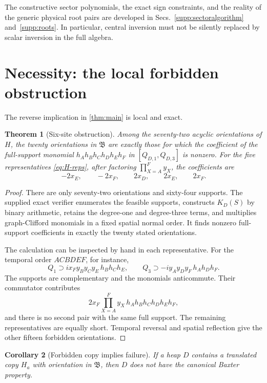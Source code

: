 \documentclass[10pt,letterpaper]{article}
\newtheorem{theorem}{Theorem}
\newtheorem{corollary}[theorem]{Corollary}
\begin{document}
The constructive sector polynomials, the exact sign constraints, and the reality of the generic physical root pairs are developed in Secs.~\ref{supp:sectoralgorithm} and~\ref{supp:roots}. In particular, central inversion must not be silently replaced by scalar inversion in the full algebra.

\section{Necessity: the local forbidden obstruction}\label{sec:obstruction}

The reverse implication in \cref{thm:main} is local and exact.

\begin{theorem}[Six-site obstruction]\label{thm:local-obstruction}
Among the seventy-two acyclic orientations of \(H\), the twenty orientations in \(\mathfrak B\) are exactly those for which the coefficient of the full-support monomial \(h_Ah_Bh_Ch_Dh_Eh_F\) in \([Q_{D,1},Q_{D,3}]\) is nonzero.  For the five representatives \eqref{eq:H-reps}, after factoring \(\prod_{X=A}^Fy_X\), the coefficients are
\begin{equation}\label{eq:five-coeffs}
 -2x_E,
 \qquad -2x_F,
 \qquad 2x_D,
 \qquad 2x_E,
 \qquad 2x_F.
\end{equation}
\end{theorem}

\begin{proof}
There are only seventy-two orientations and sixty-four supports.  The supplied exact verifier enumerates the feasible supports, constructs \(K_D(S)\) by binary arithmetic, retains the degree-one and degree-three terms, and multiplies graph-Clifford monomials in a fixed spatial normal order.  It finds nonzero full-support coefficients in exactly the twenty stated orientations.

The calculation can be inspected by hand in each representative.  For the temporal order \(ACBDEF\), for instance,
\[
 Q_1\supset i x_Fy_By_Cy_E\,h_Bh_Ch_E,
 \qquad
 Q_3\supset-i y_Ay_Dy_F\,h_Ah_Dh_F.
\]
The supports are complementary and the monomials anticommute.  Their commutator contributes
\[
 2x_F\prod_{X=A}^Fy_X\,h_Ah_Bh_Ch_Dh_Eh_F,
\]
and there is no second pair with the same full support.  The remaining representatives are equally short.  Temporal reversal and spatial reflection give the other fifteen forbidden orientations.
\end{proof}

\begin{corollary}[Forbidden copy implies failure]\label{cor:forbidden-fails}
If a heap \(D\) contains a translated copy \(H_a\) with orientation in \(\mathfrak B\), then \(D\) does not have the canonical Baxter property.
\end{corollary}
\end{document}
